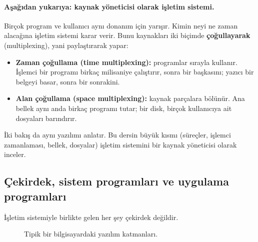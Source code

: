 \documentclass[11pt,a4paper]{article}
\newcommand{\term}[1]{\textbf{\color{mintdeep}#1}}
\begin{document}
\paragraph{Aşağıdan yukarıya: kaynak yöneticisi olarak işletim sistemi.} Birçok program ve kullanıcı aynı donanım için yarışır. Kimin neyi ne zaman alacağına işletim sistemi karar verir. Bunu kaynakları iki biçimde \term{çoğullayarak} (multiplexing), yani paylaştırarak yapar:
\begin{itemize}
  \item \textbf{Zaman çoğullama (time multiplexing):} programlar sırayla kullanır. İşlemci bir programı birkaç milisaniye çalıştırır, sonra bir başkasını; yazıcı bir belgeyi basar, sonra bir sonrakini.
  \item \textbf{Alan çoğullama (space multiplexing):} kaynak parçalara bölünür. Ana bellek aynı anda birkaç programı tutar; bir disk, birçok kullanıcıya ait dosyaları barındırır.
\end{itemize}

İki bakış da aynı yazılımı anlatır. Bu dersin büyük kısmı (süreçler, işlemci zamanlaması, bellek, dosyalar) işletim sistemini bir kaynak yöneticisi olarak inceler.

\subsection{Çekirdek, sistem programları ve uygulama programları}

İşletim sistemiyle birlikte gelen her şey çekirdek değildir.

\begin{figure}[H]
\centering
{}
\caption{Tipik bir bilgisayardaki yazılım katmanları.}
\end{figure}
\end{document}
